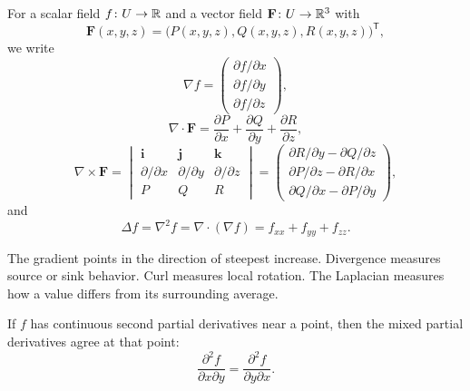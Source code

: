     \begin{definition}
        For a scalar field $f\colon U\to\mathbb{R}$ and a vector field
        $\mathbf{F}\colon U\to\mathbb{R}^3$ with
        \[
            \mathbf{F}(x,y,z)
            =
            \bigl(P(x,y,z),Q(x,y,z),R(x,y,z)\bigr)^{\mathsf T},
        \]
        we write
        \[
            \nabla f
            =
            \begin{pmatrix}
                \partial f/\partial x\\
                \partial f/\partial y\\
                \partial f/\partial z
            \end{pmatrix},
        \]
        \[
            \nabla\cdot\mathbf{F}
            =
            \frac{\partial P}{\partial x}
            +
            \frac{\partial Q}{\partial y}
            +
            \frac{\partial R}{\partial z},
        \]
        \[
            \nabla\times\mathbf{F}
            =
            \begin{vmatrix}
                \mathbf{i} & \mathbf{j} & \mathbf{k} \\
                \partial/\partial x & \partial/\partial y & \partial/\partial z \\
                P & Q & R
            \end{vmatrix}
            =
            \begin{pmatrix}
                \partial R/\partial y-\partial Q/\partial z\\
                \partial P/\partial z-\partial R/\partial x\\
                \partial Q/\partial x-\partial P/\partial y
            \end{pmatrix},
        \]
        and
        \[
            \Delta f
            =
            \nabla^2f
            =
            \nabla\cdot(\nabla f)
            =
            f_{xx}+f_{yy}+f_{zz}.
        \]
    \end{definition}

    \begin{idea}
        The gradient points in the direction of steepest increase. Divergence
        measures source or sink behavior. Curl measures local rotation. The
        Laplacian measures how a value differs from its surrounding average.
    \end{idea}

    \begin{theorem}
        If $f$ has continuous second partial derivatives near a point, then the
        mixed partial derivatives agree at that point:
        \[
            \frac{\partial^2 f}{\partial x\partial y}
            =
            \frac{\partial^2 f}{\partial y\partial x}.
        \]
    \end{theorem}

